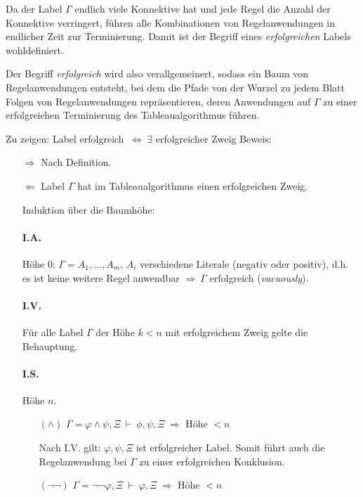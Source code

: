 \newpage
{}
Da der Label $\Gamma$ endlich viele Konnektive hat und jede Regel die Anzahl der Konnektive verringert, führen alle
Kombinationen von Regelanwendungen in endlicher Zeit zur Terminierung. Damit ist der Begriff eines \emph{erfolgreichen}
Labels wohldefiniert.

Der Begriff \emph{erfolgreich} wird also verallgemeinert, sodass ein Baum von Regelanwendungen entsteht, bei dem die
Pfade von der Wurzel zu jedem Blatt Folgen von Regelanwendungen repräsentieren, deren Anwendungen auf $\Gamma$ zu einer
erfolgreichen Terminierung des Tableaualgorithmus führen.

Zu zeigen: Label erfolgreich $ \ \Leftrightarrow \ \exists $ erfolgreicher Zweig
Beweis:
\begin{itemize}
        \item [$\Rightarrow$] Nach Definition.
        \item [$\Leftarrow$] Label $\Gamma$ hat im Tableaualgorithmus einen erfolgreichen Zweig.
                
                Induktion über die Baumhöhe:
                \paragraph{I.A.} Höhe 0: $\Gamma = A_1, \dots, A_m$, $A_i$ verschiedene Literale (negativ oder positiv),
                d.h. es ist keine weitere Regel anwendbar $\Rightarrow \ \Gamma$ erfolgreich (\emph{vacuously}).
                \paragraph{I.V.} Für alle Label $\Gamma$ der Höhe $k < n$ mit erfolgreichem Zweig gelte die Behauptung.
                \paragraph{I.S.} Höhe $n$.
                \begin{itemize}
                        \item[$(\wedge)$] $\Gamma = \varphi \wedge \psi, \Xi \ \vdash \ \phi, \psi, \Xi \ \Rightarrow $ Höhe
                                $< n$

                                Nach I.V. gilt: $\varphi, \psi, \Xi$ ist erfolgreicher Label. Somit führt auch
                                die Regelanwendung bei $\Gamma$ zu einer erfolgreichen Konklusion.
                        \item[$(\neg\neg)$] $\Gamma = \neg \neg \varphi, \Xi \ \vdash \ \varphi, \Xi \ \Rightarrow $ Höhe
                                $< n$


\end{itemize}
\end{itemize}

